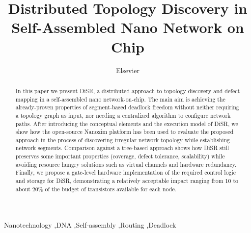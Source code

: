 \documentclass[preprint]{elsarticle}
\newcommand{\disr}{{\sf DiSR}}
\begin{document}
\begin{frontmatter}

\title{Distributed Topology Discovery in Self-Assembled Nano Network
on Chip}

\author{Elsevier}
\address{Radarweg 29, Amsterdam}





\begin{abstract}
In this paper we present \disr{}, a distributed approach to topology
discovery and defect mapping in a self-assembled nano
network-on-chip. The main aim is achieving the already-proven
properties of segment-based deadlock freedom without neither requiring
a topology graph as input, nor needing a centralized algorithm to
configure network paths.  After introducing the conceptual elements
and the execution model of \disr{}, we show how the open-source Nanoxim
platform has been used to evaluate the proposed approach in the
process of discovering irregular network topology while establishing
network segments. Comparison against a tree-based approach shows how
\disr{} still preserves some important properties (coverage, defect
tolerance, scalability) while avoiding resource hungry solutions such
as virtual channels and hardware redundancy. Finally, we propose a
gate-level hardware implementation of the required control logic and
storage for \disr{}, demonstrating a relatively acceptable impact
ranging from 10 to about 20\% of the budget of transistors available
for each node.
\end{abstract}

\begin{keyword}
Nanotechnology \sep DNA \sep Self-assembly \sep Routing \sep Deadlock
\end{keyword}
\end{frontmatter}
\end{document}
